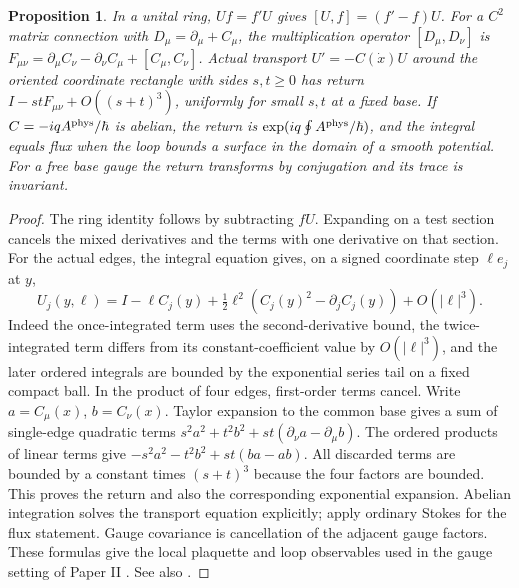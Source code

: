 \documentclass[11pt,reqno]{amsart}
\newtheorem{proposition}[theorem]{Proposition}
\theoremstyle{definition}
\theoremstyle{remark}
\numberwithin{equation}{section}
\begin{document}
\begin{proposition}\label{m3:physicalGauge}
In a unital ring, \(Uf=f' U\) gives
\([U,f]=(f'-f)U\). For a \(C^2\) matrix connection with
\(D_\mu=\partial_\mu+C_\mu\), the multiplication operator
\([D_\mu,D_\nu]\) is
\(F_{\mu\nu}=\partial_\mu C_\nu-\partial_\nu C_\mu+[C_\mu,C_\nu]\).
Actual transport \(U'=-C(\dot x)U\) around the oriented coordinate
rectangle with sides \(s,t\ge0\) has return
\(I-stF_{\mu\nu}+O((s+t)^3)\), uniformly for small \(s,t\) at
a fixed base. If \(C=-iq A^{\rm phys}/\hbar\) is abelian, the return
is \(\exp(iq\oint A^{\rm phys}/\hbar)\), and the integral equals
flux when the loop bounds a surface in the domain of a smooth
potential. For a free base gauge the return transforms by
conjugation and its trace is invariant.
\end{proposition}
\begin{proof}
The ring identity follows by subtracting \(fU\). Expanding on a
test section cancels the mixed derivatives and the terms with one
derivative on that section. For the actual edges, the integral
equation gives, on a signed coordinate step \(\ell e_j\) at \(y\),
\[
 U_j(y,\ell)=I-\ell C_j(y)
      +\tfrac12\ell^2(C_j(y)^2-\partial_j C_j(y))+O(|\ell|^3).
\]
Indeed the once-integrated term uses the second-derivative bound,
the twice-integrated term differs from its constant-coefficient
value by \(O(|\ell|^3)\), and the later ordered integrals are
bounded by the exponential series tail on a fixed compact ball.
In the product of four edges, first-order terms cancel. Write
\(a=C_\mu(x)\), \(b=C_\nu(x)\). Taylor expansion to the common
base gives a sum of single-edge quadratic terms
\(s^2a^2+t^2b^2+st(\partial_\nu a-\partial_\mu b)\).
The ordered products of linear terms give
\(-s^2a^2-t^2b^2+st(ba-ab)\).
All discarded terms are bounded by a constant times \((s+t)^3\)
because the four factors are bounded. This proves the return
and also the corresponding exponential expansion.
Abelian integration solves the transport equation explicitly;
apply ordinary Stokes for the flux statement. Gauge covariance
is cancellation of the adjacent gauge factors. These formulas
give the local plaquette and loop observables used in the gauge
setting of Paper II \cite{Companion}.
See also \cite{m3AharonovBohm,m3Wilson}.
\end{proof}
\end{document}
